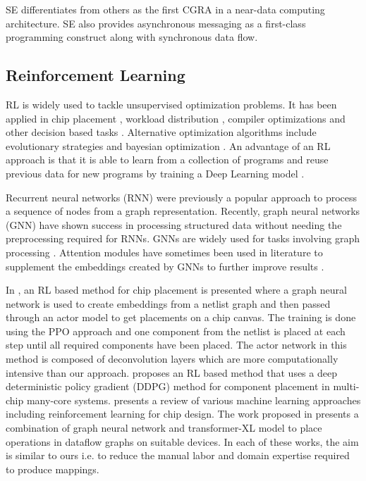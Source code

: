 SE differentiates from others as the first CGRA in a near-data computing architecture.
SE also provides asynchronous messaging as a first-class programming construct along with synchronous data flow. 


\subsection{Reinforcement Learning}
RL is widely used to tackle unsupervised optimization problems.
It has been applied in chip placement \cite{mirhoseini2020chip}, workload distribution \cite{Mirhoseini_placementRNN, addanki2019placeto, zhou2019gdp}, compiler optimizations \cite{Zhou_compileGNN} and other decision based tasks \cite{kormushev2013reinforcement, ZophL16_NASRL}. 
Alternative optimization algorithms include evolutionary strategies \cite{Zhichao_ESNAS} and bayesian optimization \cite{shi2020learned}. 
An advantage of an RL approach is that it is able to learn from a collection of programs and reuse previous data for new programs by training a Deep Learning model \cite{zhou2019gdp}.

Recurrent neural networks (RNN) \cite{hochreiter1996lstm} were previously a popular approach to process a sequence of nodes from a graph representation. 
Recently, graph neural networks (GNN) \cite{gori2005new} have shown success in processing structured data without needing the preprocessing required for RNNs.
GNNs are widely used for tasks involving graph processing \cite{Zhou_compileGNN, zhou2019gdp}. 
Attention modules have sometimes been used in literature to supplement the embeddings created by GNNs to further improve results \cite{addanki2019placeto}.

In \cite{mirhoseini2020chip}, an RL based method for chip placement is presented where a graph neural network is used to create embeddings from a netlist graph and then passed through an actor model to get placements on a chip canvas.
The training is done using the PPO approach and one component from the netlist is placed at each step until all required components have been placed.
The actor network in this method is composed of deconvolution layers which are more computationally intensive than our approach. 
\cite{wu_core_2020} proposes an RL based method that uses a deep deterministic policy gradient (DDPG) method for component placement in multi-chip many-core systems.
\cite{khailany_accelerating_2020} presents a review of various machine learning approaches including reinforcement learning for chip design.
The work proposed in \cite{zhou2019gdp} presents a combination of graph neural network and transformer-XL model to place operations in dataflow graphs on suitable devices.
In each of these works, the aim is similar to ours i.e. to reduce the manual labor and domain expertise required to produce mappings.


